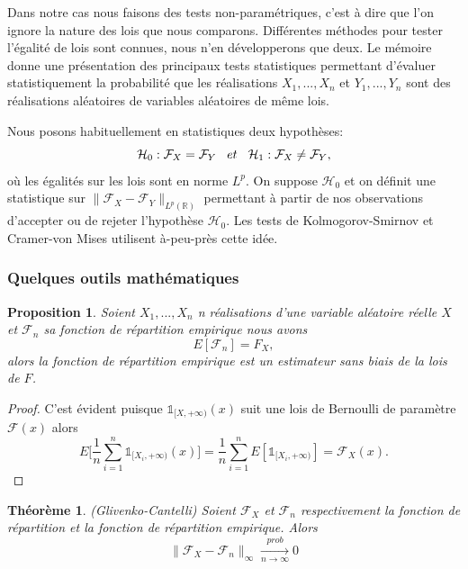 \documentclass[a4paper,10pt]{article}
\newtheorem{theorem}{Théorème}[section]
\newtheorem{proposition}{Proposition}
\begin{document}
	\vspace{0.7cm}
	
	Dans notre cas nous faisons des tests non-paramétriques, c'est à dire que l'on ignore la nature des lois que nous comparons. Différentes méthodes pour tester l'égalité de lois sont connues, nous n'en développerons que deux. Le mémoire \cite{ethier2011propos} donne une présentation des principaux tests statistiques permettant d'évaluer statistiquement la probabilité que les réalisations $X_1,...,X_n$ et $Y_1,...,Y_n$ sont des réalisations aléatoires de variables aléatoires de même lois. 
	
	Nous posons habituellement en statistiques deux hypothèses:
	\[ \mathcal{H}_0: \mathcal{F}_{X} = \mathcal{F}_{Y} \hspace{3mm} et \hspace{3mm} \mathcal{H}_1: \mathcal{F}_{X} \neq \mathcal{F}_{Y},\]
	où les égalités sur les lois sont en norme $L^p$. On suppose $\mathcal{H}_0$ et on définit une statistique sur $\|\mathcal{F}_{X}-\mathcal{F}_{Y}\|_{L^p(\mathbb{R})}$ permettant à partir de nos observations d'accepter ou de rejeter l'hypothèse $\mathcal{H}_0$.
	Les tests de Kolmogorov-Smirnov et Cramer-von Mises utilisent à-peu-près cette idée. 
	
	\subsubsection{Quelques outils mathématiques}
	\label{outils-math}
	\begin{proposition}
		\label{mean-rep-emp}
		Soient $X_1,...,X_n$ n réalisations d'une variable aléatoire réelle $X$ et $\mathcal{F}_{n}$ sa fonction de répartition empirique nous avons
		\[E[\mathcal{F}_n]=F_{X},\]
		alors la fonction de répartition empirique est un estimateur sans biais de la lois de $F$. 
	\end{proposition}
	
	\begin{proof}
		C'est évident puisque $\mathds{1}_{[X, +\infty )}(x)$ suit une lois de Bernoulli de paramètre $\mathcal{F}(x)$ alors 
		\[E\Big[\frac{1}{n}\sum_{i=1}^{n}\mathds{1}_{[X_i, +\infty )}(x)\Big]= \frac{1}{n}\sum_{i=1}^{n}E[\mathds{1}_{[X_i, +\infty )}]=\mathcal{F}_{X}(x).\]
	\end{proof}
	
	
	\begin{theorem}(Glivenko-Cantelli)
		\label{th-glivenko}
		Soient $\mathcal{F}_{X}$ et $\mathcal{F}_{n}$ respectivement la fonction de répartition et la fonction de répartition empirique. Alors 
		\begin{equation}
			\|\mathcal{F}_{X}-\mathcal{F}_{n}\|_{\infty} \xrightarrow[n\to \infty]{prob} 0 
		\end{equation}
	\end{theorem}
	
\end{document}
